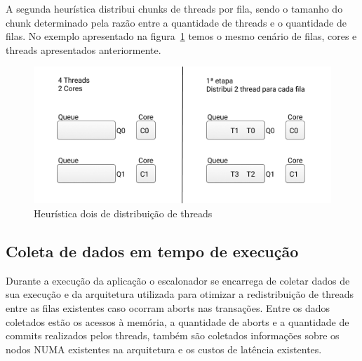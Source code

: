 \documentclass[diss,capa]{texufpel}
\begin{document}

A segunda heurística distribui chunks de threads por fila, sendo o tamanho do chunk determinado pela razão entre a quantidade de threads e o quantidade de filas. No exemplo apresentado na figura~\ref{queue_two} temos o mesmo cenário de filas, cores e threads apresentados anteriormente.



\begin{figure}[htbp]
  \centering
  \includegraphics[scale=.8]{images/Queue_two.png}
\caption{Heurística dois de distribuição de threads}
\label{queue_two}
\end{figure}


\subsection{Coleta de dados em tempo de execução}

Durante a execução da aplicação o escalonador se encarrega de coletar dados de sua execução e da arquitetura utilizada para otimizar a redistribuição de threads entre as filas existentes caso ocorram aborts nas transações. Entre os dados coletados estão os acessos à memória, a quantidade de aborts e a quantidade de commits realizados pelos threads, também são coletados informações sobre os nodos NUMA existentes na arquitetura e os custos de latência existentes.
\end{document}
